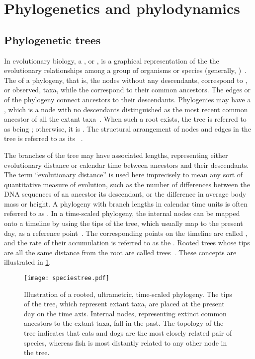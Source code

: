 \section{Phylogenetics and phylodynamics}
\label{sec:phylo}

\subsection{Phylogenetic trees}

In evolutionary biology, a , or , is a
graphical representation of the the evolutionary relationships among a group of
organisms or species (generally, )~\autocite{haeckel1866generelle}.
The  of a phylogeny, that is, the nodes without any descendants,
correspond to , or observed, taxa, while the 
correspond to their common ancestors. The edges or  of the
phylogeny connect ancestors to their descendants. Phylogenies may have a
, which is a node with no descendants distinguished as the most
recent common ancestor of all the extant
taxa~\autocite{harding1971probabilities}. When such a root exists, the tree is
referred to as being ; otherwise, it is . The
structural arrangement of nodes and edges in the tree is referred to as its
~\autocite{cavalli1967phylogenetic}. 

The branches of the tree may have associated lengths, representing either
evolutionary distance or calendar time between ancestors and their descendants.
The term ``evolutionary distance'' is used here imprecisely to mean any sort of
quantitative measure of evolution, such as the number of differences between
the DNA sequences of an ancestor its descendant, or the difference in average
body mass or height. A phylogeny with branch lengths in calendar time units is
often referred to as . In a time-scaled phylogeny, the
internal nodes can be mapped onto a timeline by using the tips of the tree,
which usually map to the present day, as a reference
point~\autocite{nee1992tempo}. The corresponding points on the timeline are
called , and the rate of their accumulation is referred
to as the . Rooted trees whose tips are all the same
distance from the root are called 
trees~\autocite{buneman1974note}. These concepts are illustrated in
\cref{fig:speciestree}.

\begin{figure}[ht]
  \centering
  \texttt{[image: speciestree.pdf]}
  \caption[Illustration of a rooted, ultrametric, time-scaled phylogeny]
    {Illustration of a rooted, ultrametric, time-scaled phylogeny. The tips of
      the tree, which represent extant taxa, are placed at the present day on
      the time axis. Internal nodes, representing extinct common ancestors to
      the extant taxa, fall in the past. The topology of the tree indicates
      that cats and dogs are the most closely related pair of species, whereas
      fish is most distantly related to any other node in the tree.}
  \label{fig:speciestree}
\end{figure}

